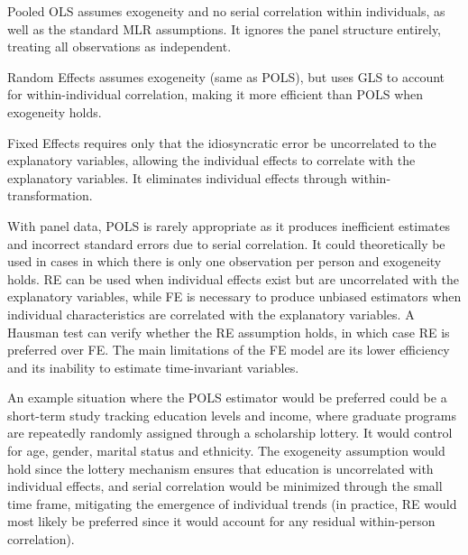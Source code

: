 


Pooled OLS assumes exogeneity and no serial correlation within individuals, as well as the standard MLR assumptions. It ignores the panel structure entirely, treating all observations as independent.

Random Effects assumes exogeneity (same as POLS), but uses GLS to account for within-individual correlation, making it more efficient than POLS when exogeneity holds.

Fixed Effects requires only that the idiosyncratic error be uncorrelated to the explanatory variables, allowing the individual effects to correlate with the explanatory variables. It eliminates individual effects through within-transformation.

With panel data, POLS is rarely appropriate as it produces inefficient estimates and incorrect standard errors due to serial correlation. It could theoretically be used in cases in which there is only one observation per person and exogeneity holds. RE can be used when individual effects exist but are uncorrelated with the explanatory variables, while FE is necessary to produce unbiased estimators when individual characteristics are correlated with the explanatory variables. A Hausman test can verify whether the RE assumption holds, in which case RE is preferred over FE. The main limitations of the FE model are its lower efficiency and its inability to estimate time-invariant variables.


An example situation where the POLS estimator would be preferred could be a short-term study tracking education levels and income, where graduate programs are repeatedly randomly assigned through a scholarship lottery. It would control for age, gender, marital status and ethnicity. The exogeneity assumption would hold since the lottery mechanism ensures that education is uncorrelated with individual effects, and serial correlation would be minimized through the small time frame, mitigating the emergence of individual trends (in practice, RE would most likely be preferred since it would account for any residual within-person correlation).

